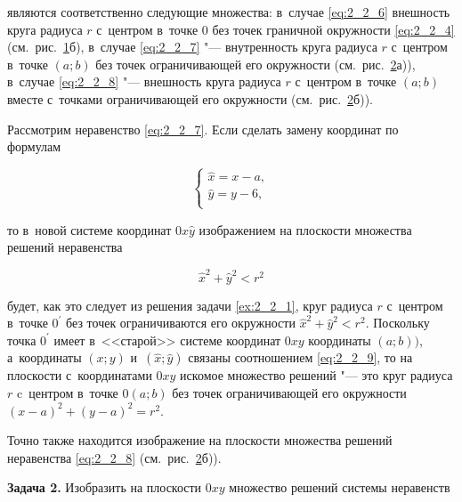 \noindent
являются соответственно следующие множества: в~случае \eqref{eq:2_2_6}
внешность круга радиуса $r$ с~центром в~точке 0 без точек граничной окружности
\eqref{eq:2_2_4} (см.\ рис.\ \ref{fig:2_2_2}б), в~случае \eqref{eq:2_2_7}
"--- внутренность круга радиуса $r$ с~центром в~точке $(a; b)$
без точек ограничивающей его окружности (см.\ рис.\ \ref{fig:2_2_3}а)),
в~случае \eqref{eq:2_2_8} "--- внешность круга радиуса $r$ с~центром
в~точке $(a; b)$ вместе с~точками ограничивающей его окружности
(см.\ рис.\ \ref{fig:2_2_3}б)).

\begin{figure}\label{fig:2_2_2}
\end{figure}

\begin{figure}\label{fig:2_2_3}
\end{figure}

Рассмотрим неравенство \eqref{eq:2_2_7}. Если сделать замену координат по формулам

\begin{equation}\label{eq:2_2_9}
\begin{cases}
\hat x = x - a, \\
\hat y = y - 6, \\
\end{cases}
\end{equation}

\noindent
то в~новой системе координат $0\hat x\hat y$ изображением на плоскости множества
решений неравенства

\begin{equation}\label{eq:2_2_10}
\hat x^{2} + \hat y^{2} < r^{2}
\end{equation}

\noindent
будет, как это следует из решения задачи \ref{ex:2_2_1}, круг радиуса $r$
с~центром в~точке $0^\prime$ без точек ограничиваются его окружности
$\hat x^{2} + \hat y^{2} < r^{2}$.
Поскольку точка $0^\prime$ имеет в~<<старой>> системе координат
$0xy$ координаты $(a; b))$, а~координаты $(x;y)$ и~$(\hat x; \hat y)$
связаны соотношением \eqref{eq:2_2_9},
то на плоскости с~координатами $0xy$ искомое множество решений "--- это круг
радиуса $r$ c~центром в~точке $0 (a; b)$ без точек ограничивающей его окружности
$(x - a)^{2} + (y - a)^{2} = r^{2}$.

Точно также находится изображение на плоскости множества решений неравенства
\eqref{eq:2_2_8} (см.\ рис.\ \ref{fig:2_2_3}б)).

\textbf{Задача 2.}\label{ex:2_2_2} Изобразить на плоскости $0xy$ множество решений
системы неравенств

